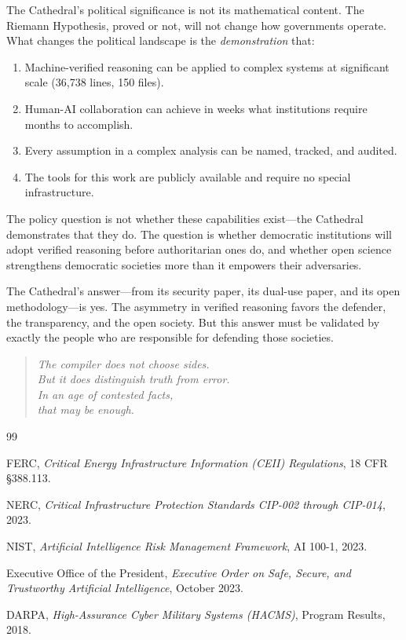 \documentclass[11pt,a4paper]{article}
\begin{document}
The Cathedral's political significance is not its mathematical
content. The Riemann Hypothesis, proved or not, will not change
how governments operate. What changes the political landscape is
the \emph{demonstration} that:

\begin{enumerate}
  \item Machine-verified reasoning can be applied to complex systems
    at significant scale (36,738 lines, 150 files).
  \item Human-AI collaboration can achieve in weeks what
    institutions require months to accomplish.
  \item Every assumption in a complex analysis can be named,
    tracked, and audited.
  \item The tools for this work are publicly available and require
    no special infrastructure.
\end{enumerate}

The policy question is not whether these capabilities exist---the
Cathedral demonstrates that they do. The question is whether
democratic institutions will adopt verified reasoning before
authoritarian ones do, and whether open science strengthens
democratic societies more than it empowers their adversaries.

The Cathedral's answer---from its security paper, its dual-use
paper, and its open methodology---is yes. The asymmetry in
verified reasoning favors the defender, the transparency, and
the open society. But this answer must be validated by exactly
the people who are responsible for defending those societies.

\begin{quote}
\emph{The compiler does not choose sides.\\
But it does distinguish truth from error.\\
In an age of contested facts,\\
that may be enough.}
\end{quote}

\begin{thebibliography}{99}

FERC, \emph{Critical Energy Infrastructure Information (CEII)
Regulations}, 18 CFR \S 388.113.

NERC, \emph{Critical Infrastructure Protection Standards
CIP-002 through CIP-014}, 2023.

NIST, \emph{Artificial Intelligence Risk Management Framework},
AI 100-1, 2023.

Executive Office of the President, \emph{Executive Order on Safe,
Secure, and Trustworthy Artificial Intelligence}, October 2023.

DARPA, \emph{High-Assurance Cyber Military Systems (HACMS)},
Program Results, 2018.

\end{thebibliography}
\end{document}
